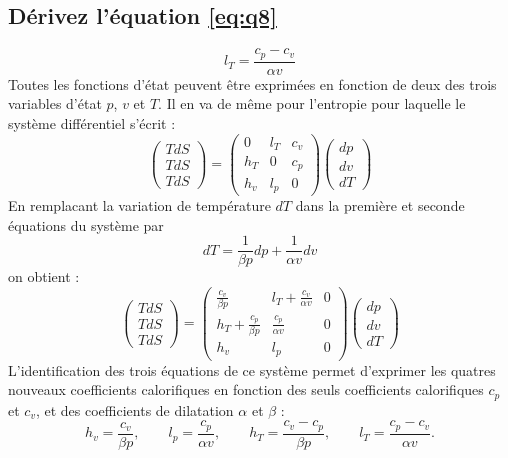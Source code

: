 \subsection{Dérivez l'équation \ref{eq:q8}}
\begin{equation} l_T = \frac{c_p-c_v}{\alpha v} \label{eq:q8}\end{equation}
Toutes les fonctions d'état peuvent être exprimées en fonction de deux des trois variables d'état $p$, $v$ et $T$. Il en va de même pour l'entropie pour laquelle le système différentiel s'écrit :
\begin{equation}\begin{pmatrix}TdS\\TdS\\TdS\end{pmatrix} = \begin{pmatrix}0 & l_T & c_v \\ h_T & 0 & c_p \\ h_v & l_p & 0\end{pmatrix}\begin{pmatrix}dp\\dv\\dT\end{pmatrix} \end{equation}
En remplacant la variation de température $dT$ dans la première et seconde équations du système par 
\begin{equation} dT = \frac{1}{\beta p}dp + \frac{1}{\alpha v}dv \end{equation}
on obtient :
\begin{equation}\begin{pmatrix}TdS\\TdS\\TdS\end{pmatrix} = \begin{pmatrix}\frac{c_v}{\beta p} & l_T + \frac{c_v}{\alpha v} & 0\\ h_T + \frac{c_p}{\beta p} & \frac{c_p}{\alpha v} & 0 \\ h_v & l_p & 0\end{pmatrix}\begin{pmatrix}dp\\dv\\dT\end{pmatrix} \end{equation}
L'identification des trois équations de ce système permet d'exprimer les quatres nouveaux coefficients calorifiques en fonction des seuls coefficients calorifiques $c_p$ et $c_v$, et des coefficients de dilatation $\alpha$ et $\beta$ :
\begin{equation} h_v = \frac{c_v}{\beta p}, \qquad l_p = \frac{c_p}{\alpha v}, \qquad h_T = \frac{c_v-c_p}{\beta p}, \qquad l_T = \frac{c_p-c_v}{\alpha v}.\end{equation}
